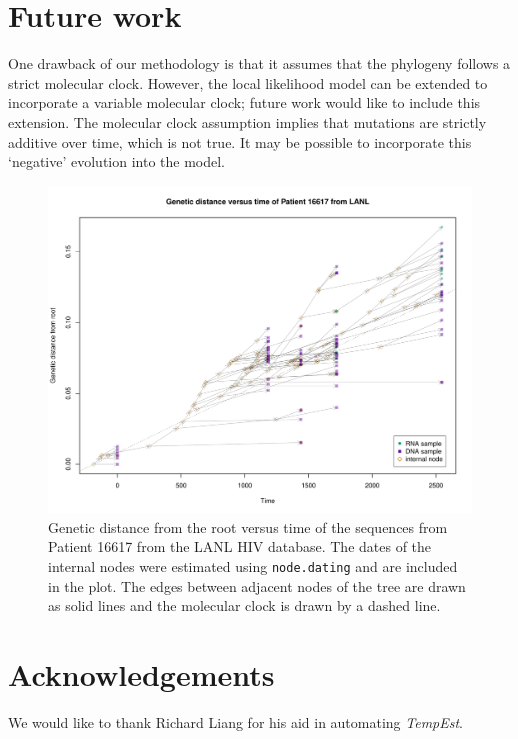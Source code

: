 \documentclass{bioinfo}
\newcommand{\code}[1]{{\tt #1}}
\begin{document}
\vspace*{-18pt}

\section{Future work} \label{sec:discuss}
One drawback of our methodology is that it assumes that the phylogeny follows a strict molecular clock.
However, the local likelihood model can be extended to incorporate a variable molecular clock; future work would like to include this extension.
The molecular clock assumption implies that mutations are strictly additive over time, which is not true.
It may be possible to incorporate this `negative' evolution into the model.

\begin{figure}[b]
	\centering
	\includegraphics[width=\columnwidth]{patient_16617}
	\caption[Genetic distance versus time plot]{Genetic distance from the root versus time of the sequences from Patient 16617 from the LANL HIV database. The dates of the internal nodes were estimated using \code{node.dating} and are included in the plot. The edges between adjacent nodes of the tree are drawn as solid lines and the molecular clock is drawn by a dashed line.}
	\label{fig:pat16617}
\end{figure}

\vspace*{-18pt}

\section*{Acknowledgements} \label{sec:ackn}
We would like to thank Richard Liang for his aid in automating \emph{TempEst}.
\end{document}
